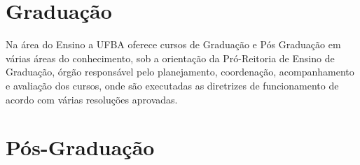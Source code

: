 \chapter{Graduação}

Na área do Ensino a UFBA oferece cursos de Graduação e Pós Graduação em várias áreas do conhecimento, sob a orientação da Pró-Reitoria de Ensino de Graduação, órgão responsável pelo planejamento, coordenação, acompanhamento e avaliação dos cursos, onde são executadas as diretrizes de funcionamento de acordo com várias resoluções  aprovadas.





\chapter{Pós-Graduação}





